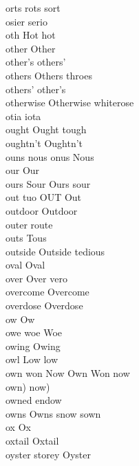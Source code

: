 orts rots sort\\
osier serio\\
oth Hot hot\\
other Other\\
other's others'\\
others Others throes\\
others' other's\\
otherwise Otherwise whiterose\\
otia iota\\
ought Ought tough\\
oughtn't Oughtn't\\
ouns nous onus Nous\\
our Our\\
ours Sour Ours sour\\
out tuo OUT Out\\
outdoor Outdoor\\
outer route\\
outs Tous\\
outside Outside tedious\\
oval Oval\\
over Over vero\\
overcome Overcome\\
overdose Overdose\\
ow Ow\\
owe woe Woe\\
owing Owing\\
owl Low low\\
own won Now Own Won now\\
own) now)\\
owned endow\\
owns Owns snow sown\\
ox Ox\\
oxtail Oxtail\\
oyster storey Oyster\\

